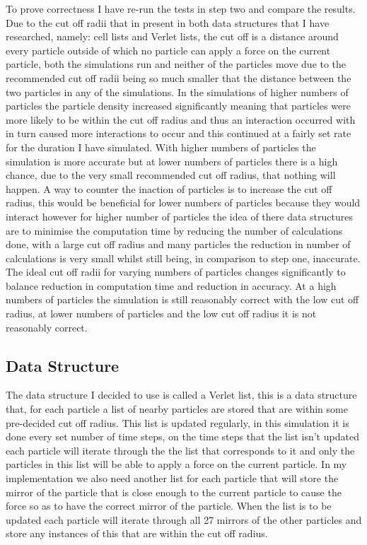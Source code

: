 \documentclass[paper=a4, fontsize=11pt]{scrartcl}
\numberwithin{equation}{section}		%
\numberwithin{figure}{section}			%
\numberwithin{table}{section}				%
\begin{document}
To prove correctness I have re-run the tests in step two and compare the results. Due to the cut off radii that in present in both data structures that I have researched, namely: cell lists and Verlet lists, the cut off is a distance around every particle outside of which no particle can apply a force on the current particle, both the simulations run and neither of the particles move due to the recommended cut off radii being so much smaller that the distance between the two particles in any of the simulations. In the simulations of higher numbers of particles the particle density increased significantly meaning that particles were more likely to be within the cut off radius and thus an interaction occurred with in turn caused more interactions to occur and this continued at a fairly set rate for the duration I have simulated. With higher numbers of particles the simulation is more accurate but at lower numbers of particles there is a high chance, due to the very small recommended cut off radius, that nothing will happen. A way to counter the inaction of particles is to increase the cut off radius, this would be beneficial for lower numbers of particles because they would interact however for higher number of particles the idea of there data structures are to minimise the computation time by reducing the number of calculations done, with a large cut off radius and many particles the reduction in number of calculations is very small whilst still being, in comparison to step one, inaccurate. The ideal cut off radii for varying numbers of particles changes significantly to balance reduction in computation time and reduction in accuracy. At a high numbers of particles the simulation is still reasonably correct with the low cut off radius, at lower numbers of particles and the low cut off radius it is not reasonably correct. 

\subsection{Data Structure}

The data structure I decided to use is called a Verlet list, this is a data structure that, for each particle a list of nearby particles are stored that are within some pre-decided cut off radius. This list is updated regularly, in this simulation it is done every set number of time steps, on the time steps that the list isn't updated each particle will iterate through the the list that corresponds to it and only the particles in this list will be able to apply a force on the current particle. In my implementation we also need another list for each particle that will store the mirror of the particle that is close enough to the current particle to cause the force so as to have the correct mirror of the particle. When the list is to be updated each particle will iterate through all 27 mirrors of the other particles and store any instances of this that are within the cut off radius. 
\end{document}
